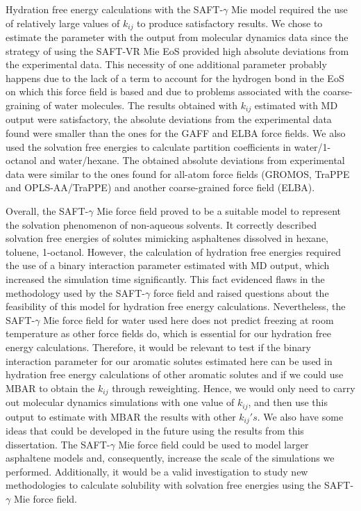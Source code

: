 \documentclass[
	12pt,				%
	openany,			%
	oneside,			%
	a4paper,			%
	english,			%
	brazil				%
	]{abntex2}
\begin{document}
Hydration free energy calculations with the SAFT-$\gamma$ Mie model required the use of relatively large values of $k_{ij}$ to produce satisfactory results. We chose to estimate the parameter with the output from molecular dynamics data since the strategy of using the SAFT-VR Mie EoS provided high absolute deviations from the experimental data. This necessity of one additional parameter probably happens due to the lack of a term to account for the hydrogen bond in the EoS on which this force field is based and due to problems associated with the coarse-graining of water molecules. The results obtained with $k_{ij}$ estimated with MD output were satisfactory, the absolute deviations from the experimental data found were smaller than the ones for the GAFF and ELBA force fields. We also used the solvation free energies to calculate partition coefficients in water/1-octanol and water/hexane. The obtained absolute deviations from experimental data were similar to the ones found for all-atom force fields (GROMOS, TraPPE and OPLS-AA/TraPPE) and another coarse-grained force field (ELBA).

Overall, the SAFT-$\gamma$ Mie force field proved to be a suitable model to represent the solvation phenomenon of non-aqueous solvents. It correctly described solvation free energies of solutes mimicking asphaltenes dissolved in hexane, toluene, 1-octanol. However, the calculation of hydration free energies required the use of a binary interaction parameter estimated with MD output, which increased the simulation time significantly. This fact evidenced flaws in the methodology used by the SAFT-$\gamma$ force field and raised questions about the feasibility of this model for hydration free energy calculations. Nevertheless, the SAFT-$\gamma$ Mie force field for water used here does not predict freezing at room temperature as other force fields do, which is essential for our hydration free energy calculations. Therefore, it would be relevant to test if the binary interaction parameter for our aromatic solutes estimated here can be used in hydration free energy calculations of other aromatic solutes and if we could use MBAR to obtain the $k_{ij}$ through reweighting. Hence, we would only need to carry out molecular dynamics simulations with one value of $k_{ij}$, and then use this output to estimate with MBAR the results with other $k_{ij} 's $. We also have some ideas that could be developed in the future using the results from this dissertation. The SAFT-$\gamma$ Mie force field could be used to model larger asphaltene models and, consequently, increase the scale of the simulations we performed. Additionally, it would be a valid investigation to study new methodologies to calculate solubility with solvation free energies using the SAFT-$\gamma$ Mie force field.
\end{document}
